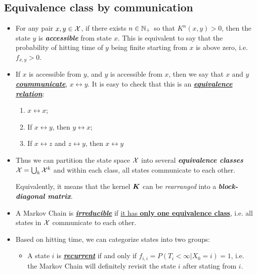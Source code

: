 \documentclass[11pt]{article}
\begin{document}
\subsection{Equivalence class by communication}
\begin{itemize}
\item \begin{definition}
For any pair $x, y \in {\mathcal X}$, if there exists $n \in {\mathbb N}_{+}$ so that $K^{n}(x, y) > 0$, then the state $y$ is \emph{\textbf{accessible}} from state $x$. This is equivalent to say that the probability of hitting time of $y$ being finite starting from $x$ is above zero, i.e. \underline{$f_{x,y} >0$}.
\end{definition}

\item If $x$ is accessible from $y$, and $y$ is accessible from $x$, then we say that $x$ and $y$ \underline{\emph{\textbf{coummunicate}}},
$x \leftrightarrow y$. It is easy to check that this is an \underline{\emph{\textbf{equivalence relation}}}:
\begin{enumerate}
\item $x \leftrightarrow x$;
\item If $x \leftrightarrow y$, then $y \leftrightarrow x$;
\item If $x \leftrightarrow z$ and $z \leftrightarrow y$, then $x \leftrightarrow y$ 
\end{enumerate}

\item Thus we can partition the state space ${\mathcal X}$ into several \emph{\textbf{equivalence classes}} ${\mathcal X}= \bigcup_{k}{\mathcal X}^{k}$ and within each class, all states communicate to each other. 

Equivalently, it means that the kernel $\boldsymbol{K}$ can be \emph{rearranged} into a \textbf{\emph{block-diagonal matrix}}.


\item 
 \begin{definition}
A Markov Chain is \underline{\emph{\textbf{irreducible}}} if \underline{it has \textbf{only one equivalence class}}, i.e. all states in ${\mathcal X}$ communicate to each other.
\end{definition}


\item Based on hitting time, we can categorize states into two groups:
 
\begin{itemize}
\item \begin{definition} A state $i$ is \underline{\emph{\textbf{recurrent}}} if and only if \underline{$f_{i,i} =  P(T_{i} < \infty | X_{0} = i) = 1$}, i.e. the Markov Chain will definitely revisit the state $i$ after stating from $i$.
\end{definition}


\end{itemize}
\end{itemize}
\end{document}
